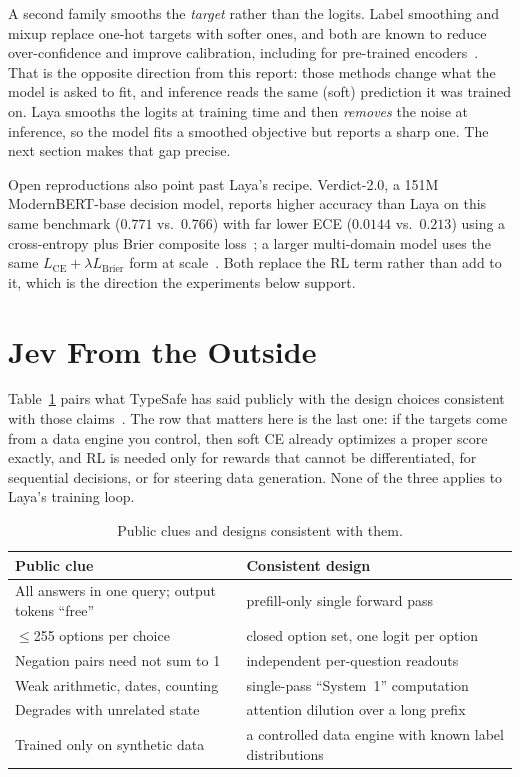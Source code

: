 \documentclass[conference]{IEEEtran}
\begin{document}
A second family smooths the \emph{target} rather than the logits. Label
smoothing and mixup replace one-hot targets with softer ones, and both are
known to reduce over-confidence and improve calibration, including for
pre-trained encoders~\cite{muller2019labelsmoothing,thulasidasan2019mixup,desai2020calibration}.
That is the opposite direction from this report: those methods change what the
model is asked to fit, and inference reads the same (soft) prediction it was
trained on. Laya smooths the logits at training time and then \emph{removes}
the noise at inference, so the model fits a smoothed objective but reports a
sharp one. The next section makes that gap precise.

Open reproductions also point past Laya's recipe. Verdict-2.0, a 151M
ModernBERT-base decision model, reports higher accuracy than Laya on this same
benchmark ($0.771$ vs.\ $0.766$) with far lower ECE ($0.0144$ vs.\ $0.213$)
using a cross-entropy plus Brier composite loss~\cite{openjev}; a larger
multi-domain model uses the same $L_\mathrm{CE}+\lambda L_\mathrm{Brier}$ form
at scale~\cite{von}. Both replace the RL term rather than add to it, which is
the direction the experiments below support.

\section{Jev From the Outside}
\label{sec:jev}

Table~\ref{tab:clues} pairs what TypeSafe has said publicly with the design
choices consistent with those claims~\cite{typesafe_blog,typesafe_docs,techcrunch_jev}.
The row that matters here is the last
one: if the targets come from a data engine you control, then soft CE already
optimizes a proper score exactly, and RL is needed only for rewards that
cannot be differentiated, for sequential decisions, or for steering data
generation. None of the three applies to Laya's training loop.

\begin{table}[t]
\caption{Public clues and designs consistent with them.}
\label{tab:clues}
\centering
\footnotesize
\begin{tabular}{@{}p{}p{}@{}}
\toprule
Public clue & Consistent design \\
\midrule
All answers in one query; output tokens ``free'' & prefill-only single forward pass \\
$\le$255 options per choice & closed option set, one logit per option \\
Negation pairs need not sum to 1 & independent per-question readouts \\
Weak arithmetic, dates, counting & single-pass ``System~1'' computation \\
Degrades with unrelated state & attention dilution over a long prefix \\
Trained only on synthetic data & a controlled data engine with known label distributions \\
\bottomrule
\end{tabular}
\end{table}
\end{document}
